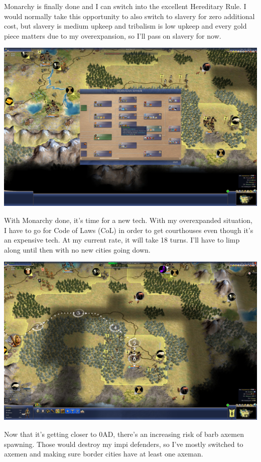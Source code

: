\documentclass[10pt]{article}
\begin{document}
Monarchy is finally done and I can switch into the excellent Hereditary Rule. I would normally take this opportunity
to also switch to slavery for zero additional cost, but slavery is medium upkeep and tribalism is low upkeep and
every gold piece matters due to my overexpansion, so I'll pass on slavery for now.

\includegraphics[width=1.0\textwidth]{82}

With Monarchy done, it's time for a new tech. With my overexpanded situation, I have to go for Code of Laws (CoL)
in order to get courthouses even though it's an expensive tech. At my current rate, it will take 18 turns. I'll
have to limp along until then with no new cities going down.

\includegraphics[width=1.0\textwidth]{84}

Now that it's getting closer to 0AD, there's an increasing risk of barb axemen spawning. Those would destroy
my impi defenders, so I've mostly switched to axemen and making sure border cities have at least one axeman.
\end{document}
